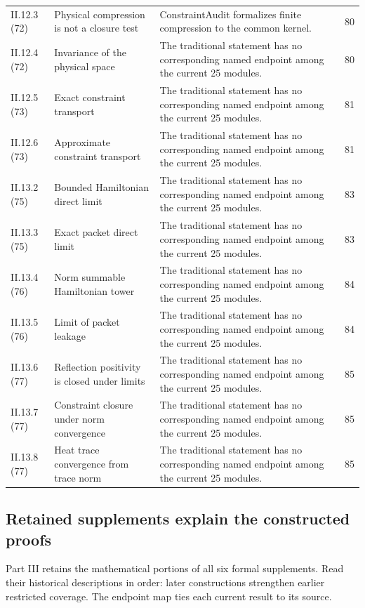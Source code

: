 {\begin{longtable}{@{}p{.13\linewidth}p{.31\linewidth}p{.42\linewidth}r@{}}
II.12.3 (72) & Physical compression is not a closure test & ConstraintAudit formalizes finite compression to the common kernel. & 80\\
II.12.4 (72) & Invariance of the physical space & The traditional statement has no corresponding named endpoint among the current 25 modules. & 80\\
II.12.5 (73) & Exact constraint transport & The traditional statement has no corresponding named endpoint among the current 25 modules. & 81\\
II.12.6 (73) & Approximate constraint transport & The traditional statement has no corresponding named endpoint among the current 25 modules. & 81\\
II.13.2 (75) & Bounded Hamiltonian direct limit & The traditional statement has no corresponding named endpoint among the current 25 modules. & 83\\
II.13.3 (75) & Exact packet direct limit & The traditional statement has no corresponding named endpoint among the current 25 modules. & 83\\
II.13.4 (76) & Norm summable Hamiltonian tower & The traditional statement has no corresponding named endpoint among the current 25 modules. & 84\\
II.13.5 (76) & Limit of packet leakage & The traditional statement has no corresponding named endpoint among the current 25 modules. & 84\\
II.13.6 (77) & Reflection positivity is closed under limits & The traditional statement has no corresponding named endpoint among the current 25 modules. & 85\\
II.13.7 (77) & Constraint closure under norm convergence & The traditional statement has no corresponding named endpoint among the current 25 modules. & 85\\
II.13.8 (77) & Heat trace convergence from trace norm & The traditional statement has no corresponding named endpoint among the current 25 modules. & 85\\
\bottomrule\end{longtable}}
\subsection{Retained supplements explain the constructed proofs}
Part III retains the mathematical portions of all six formal supplements. Read their historical descriptions in order: later constructions strengthen earlier restricted coverage. The endpoint map ties each current result to its source.

